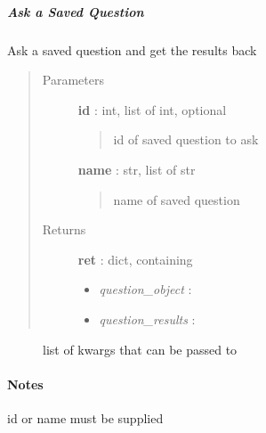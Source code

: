 \documentclass[letterpaper,10pt,english]{sphinxmanual}
\begin{document}
\subparagraph{Ask a Saved Question}
\label{pytan.handler:ask-a-saved-question}

\begin{fulllineitems}
\label{pytan.handler:pytan.handler.Handler.ask_saved}
Ask a saved question and get the results back
\begin{quote}\begin{description}
\item[{Parameters}] \leavevmode
\textbf{id} : int, list of int, optional
\begin{quote}

id of saved question to ask
\end{quote}

\textbf{name} : str, list of str
\begin{quote}

name of saved question
\end{quote}

\item[{Returns}] \leavevmode
\textbf{ret} : dict, containing
\begin{itemize}
\item {} 
\emph{question\_object} : {\hyperref[taniumpy.object_types:taniumpy.object_types.saved_question.SavedQuestion]{}}

\item {} 
\emph{question\_results} : {\hyperref[taniumpy.object_types:taniumpy.object_types.result_set.ResultSet]{}}

\end{itemize}

\end{description}\end{quote}



\begin{description}
\item[{{\hyperref[pytan.constants:pytan.constants.ASK_KWARGS]{}}}] \leavevmode
list of kwargs that can be passed to {\hyperref[taniumpy.question_asker:taniumpy.question_asker.QuestionAsker]{}}

\end{description}


\paragraph{Notes}

id or name must be supplied

\end{fulllineitems}
\end{document}
